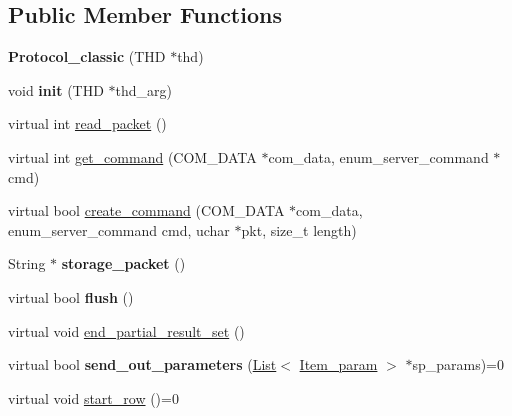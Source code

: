 \subsection*{Public Member Functions}
\begin{DoxyCompactItemize}
\item 
\mbox{\label{classProtocol__classic_a747a26937416c9718ff96991fd00c751}} 
{\bfseries Protocol\+\_\+classic} (T\+HD $\ast$thd)
\item 
\mbox{\label{classProtocol__classic_a86af11114bbdba1e0b1728230c24917e}} 
void {\bfseries init} (T\+HD $\ast$thd\+\_\+arg)
\item 
virtual int \mbox{\hyperlink{classProtocol__classic_afabebba2b775725054454c1cbe2e3721}{read\+\_\+packet}} ()
\item 
virtual int \mbox{\hyperlink{classProtocol__classic_aba5dc41da980210f755d7b8c2c1ab7bf}{get\+\_\+command}} (C\+O\+M\+\_\+\+D\+A\+TA $\ast$com\+\_\+data, enum\+\_\+server\+\_\+command $\ast$cmd)
\item 
virtual bool \mbox{\hyperlink{classProtocol__classic_aa0cc15d531ce9c29b92a2145d98b0c7a}{create\+\_\+command}} (C\+O\+M\+\_\+\+D\+A\+TA $\ast$com\+\_\+data, enum\+\_\+server\+\_\+command cmd, uchar $\ast$pkt, size\+\_\+t length)
\item 
\mbox{\label{classProtocol__classic_af668d7642e148d6216c2a1f305442902}} 
String $\ast$ {\bfseries storage\+\_\+packet} ()
\item 
\mbox{\label{classProtocol__classic_abfe55468d9429ae8f3144428e064f0f6}} 
virtual bool {\bfseries flush} ()
\item 
virtual void \mbox{\hyperlink{classProtocol__classic_ab214a75392383f6c3fa56a82d4af06f6}{end\+\_\+partial\+\_\+result\+\_\+set}} ()
\item 
\mbox{\label{classProtocol__classic_a44d374a34f9e8c748f3eddc8006cfd91}} 
virtual bool {\bfseries send\+\_\+out\+\_\+parameters} (\mbox{\hyperlink{classList}{List}}$<$ \mbox{\hyperlink{classItem__param}{Item\+\_\+param}} $>$ $\ast$sp\+\_\+params)=0
\item 
virtual void \mbox{\hyperlink{classProtocol__classic_acebdc50db1e9403c19bb8909af300fec}{start\+\_\+row}} ()=0
\item 

\end{DoxyCompactItemize}
